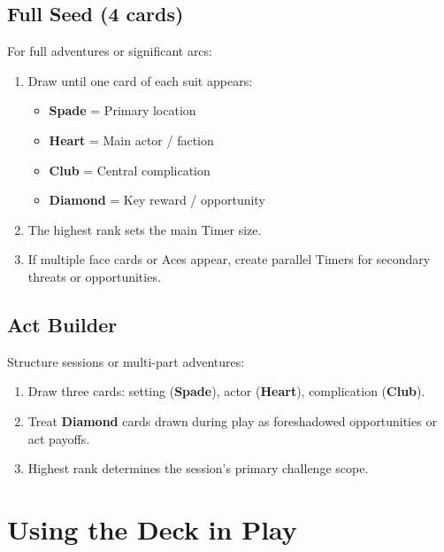 \subsection{Full Seed (4 cards)}\label{subsec:full_seed}
For full adventures or significant arcs:
\begin{enumerate}
    \item Draw until one card of each suit appears:
        \begin{itemize}
            \item \textbf{Spade} = Primary location 
            \item \textbf{Heart} = Main actor / faction 
            \item \textbf{Club} = Central complication 
            \item \textbf{Diamond} = Key reward / opportunity 
        \end{itemize}
    \item The highest rank sets the main Timer size.
    \item If multiple face cards or Aces appear, create parallel Timers for secondary threats or opportunities.
\end{enumerate}

\subsection{Act Builder}\label{subsec:act_builder}
Structure sessions or multi-part adventures:
\begin{enumerate}
    \item Draw three cards: setting (\textbf{Spade}), actor (\textbf{Heart}), complication (\textbf{Club}).
    \item Treat \textbf{Diamond} cards drawn during play as foreshadowed opportunities or act payoffs.
    \item Highest rank determines the session's primary challenge scope.
\end{enumerate}

\section{Using the Deck in Play}\label{sec:deck_in_play}

